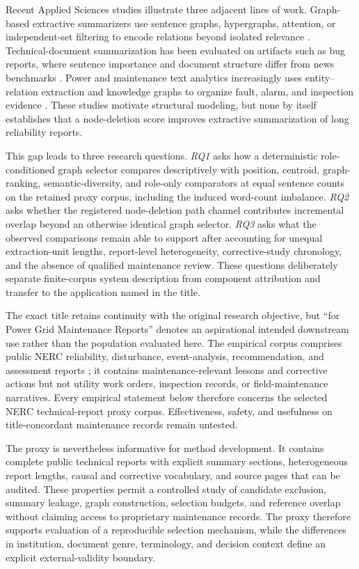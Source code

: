 \documentclass[applsci,article,submit,moreauthors]{Definitions/mdpi}
\begin{document}
Recent Applied Sciences studies illustrate three adjacent lines of work. Graph-based extractive summarizers use sentence graphs, hypergraphs, attention, or independent-set filtering to encode relations beyond isolated relevance \cite{siragusa2022sentencegraph,onan2024mches,hark2025mis}. Technical-document summarization has been evaluated on artifacts such as bug reports, where sentence importance and document structure differ from news benchmarks \cite{koh2022bugreport}. Power and maintenance text analytics increasingly uses entity--relation extraction and knowledge graphs to organize fault, alarm, and inspection evidence \cite{liu2022powerfault,ma2025alarm,zgg2026bridge}. These studies motivate structural modeling, but none by itself establishes that a node-deletion score improves extractive summarization of long reliability reports.

This gap leads to three research questions. \textit{RQ1} asks how a deterministic role-conditioned graph selector compares descriptively with position, centroid, graph-ranking, semantic-diversity, and role-only comparators at equal sentence counts on the retained proxy corpus, including the induced word-count imbalance. \textit{RQ2} asks whether the registered node-deletion path channel contributes incremental overlap beyond an otherwise identical graph selector. \textit{RQ3} asks what the observed comparisons remain able to support after accounting for unequal extraction-unit lengths, report-level heterogeneity, corrective-study chronology, and the absence of qualified maintenance review. These questions deliberately separate finite-corpus system description from component attribution and transfer to the application named in the title.

The exact title retains continuity with the original research objective, but ``for Power Grid Maintenance Reports'' denotes an aspirational intended downstream use rather than the population evaluated here. The empirical corpus comprises public NERC reliability, disturbance, event-analysis, recommendation, and assessment reports \cite{nercEventAnalysis,nerc2015qualityreport}; it contains maintenance-relevant lessons and corrective actions but not utility work orders, inspection records, or field-maintenance narratives. Every empirical statement below therefore concerns the selected NERC technical-report proxy corpus. Effectiveness, safety, and usefulness on title-concordant maintenance records remain untested.

The proxy is nevertheless informative for method development. It contains complete public technical reports with explicit summary sections, heterogeneous report lengths, causal and corrective vocabulary, and source pages that can be audited. These properties permit a controlled study of candidate exclusion, summary leakage, graph construction, selection budgets, and reference overlap without claiming access to proprietary maintenance records. The proxy therefore supports evaluation of a reproducible selection mechanism, while the differences in institution, document genre, terminology, and decision context define an explicit external-validity boundary.
\end{document}
